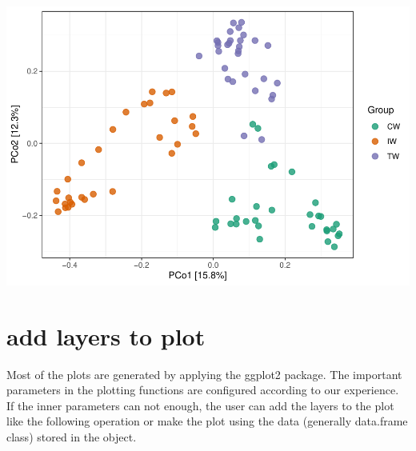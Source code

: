 \documentclass[
]{book}
\newenvironment{Shaded}{\begin{snugshade}}{\end{snugshade}}
\newcommand{\AttributeTok}[1]{\textcolor[rgb]{0.77,0.63,0.00}{#1}}
\newcommand{\CommentTok}[1]{\textcolor[rgb]{0.56,0.35,0.01}{\textit{#1}}}
\newcommand{\ConstantTok}[1]{\textcolor[rgb]{0.00,0.00,0.00}{#1}}
\newcommand{\DecValTok}[1]{\textcolor[rgb]{0.00,0.00,0.81}{#1}}
\newcommand{\FunctionTok}[1]{\textcolor[rgb]{0.00,0.00,0.00}{#1}}
\newcommand{\NormalTok}[1]{#1}
\newcommand{\OtherTok}[1]{\textcolor[rgb]{0.56,0.35,0.01}{#1}}
\newcommand{\SpecialCharTok}[1]{\textcolor[rgb]{0.00,0.00,0.00}{#1}}
\newcommand{\StringTok}[1]{\textcolor[rgb]{0.31,0.60,0.02}{#1}}
\begin{document}
\includegraphics{microeco-tutorial_files/figure-latex/unnamed-chunk-284-1.pdf}

\hypertarget{add-layers-to-plot}{%
\section{add layers to plot}\label{add-layers-to-plot}}

Most of the plots are generated by applying the ggplot2 package.
The important parameters in the plotting functions are configured according to our experience.
If the inner parameters can not enough, the user can add the layers to the plot like the following operation or
make the plot using the data (generally data.frame class) stored in the object.

\begin{Shaded}
\end{Shaded}
\end{document}
